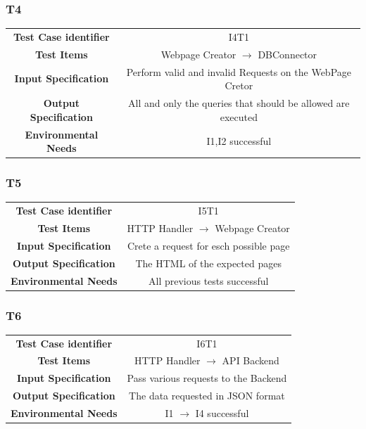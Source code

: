 \documentclass{article}
\begin{document}
\subsubsection{T4}
\begin{adjustbox}{width=1.2\textwidth}	
	\begin{tabular}{*{2}{c}}
		\toprule
		\textbf{Test Case identifier} & I4T1\\
		\textbf{Test Items} & Webpage Creator $\rightarrow$ DBConnector\\
		\textbf{Input Specification} & Perform valid and invalid Requests on the WebPage Cretor\\
		\textbf{Output Specification} & All and only the queries that should be allowed are executed\\
		\textbf{Environmental Needs} & I1,I2 successful\\
		\bottomrule
	\end{tabular}
\end{adjustbox}
\subsubsection{T5}
\begin{adjustbox}{width=1.2\textwidth}	
	\begin{tabular}{*{2}{c}}
		\toprule
		\textbf{Test Case identifier} & I5T1\\
		\textbf{Test Items} & HTTP Handler $\rightarrow$ Webpage Creator\\
		\textbf{Input Specification} & Crete a request for esch possible page\\
		\textbf{Output Specification} & The HTML of the expected pages\\
		\textbf{Environmental Needs} & All previous tests successful\\
		\bottomrule
	\end{tabular}
\end{adjustbox}
\subsubsection{T6}
\begin{adjustbox}{width=1.2\textwidth}	
	\begin{tabular}{*{2}{c}}
		\toprule
		\textbf{Test Case identifier} & I6T1\\
		\textbf{Test Items} & HTTP Handler $\rightarrow$ API Backend \\
		\textbf{Input Specification} & Pass various requests to the Backend\\
		\textbf{Output Specification} & The data requested in JSON format\\
		\textbf{Environmental Needs} & I1 $\rightarrow$ I4 successful\\
		\bottomrule
	\end{tabular}
\end{adjustbox}
\end{document}
